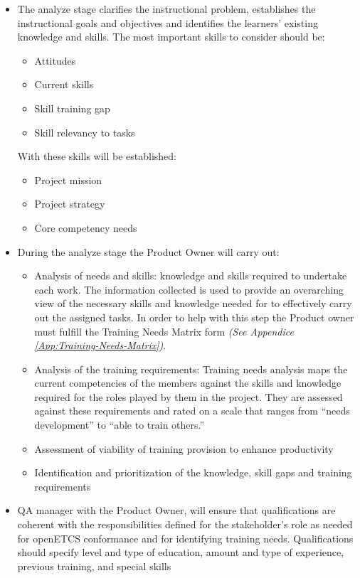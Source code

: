 \documentclass{template/openetcs_article}
\begin{document}
\begin{itemize}
\item The analyze stage clarifies the instructional problem, establishes the instructional goals and objectives and identifies the learners' existing knowledge and skills. The most important skills to consider should be: 
\begin{itemize}
\item Attitudes
\item Current skills
\item Skill training gap
\item Skill relevancy to tasks
\end{itemize}
With these skills will be established:
\begin{itemize}
\item Project mission
\item Project strategy
\item Core competency needs
\end{itemize}
\item During the analyze stage the Product Owner will carry out:
\begin{itemize}
\item Analysis of needs and skills: knowledge and skills required to undertake each work. The information collected is used to provide an overarching view of the necessary skills and knowledge needed for to effectively carry out the assigned tasks. In order to help with this step the Product owner must fulfill the Training Needs Matrix form {\it{(See Appendice \ref{App:Training-Needs-Matrix})}}.
\item Analysis of the training requirements: Training needs analysis maps the current competencies of the members against the skills and knowledge required for the roles played by them in the project. They are assessed against these requirements and rated on a scale that ranges from “needs development” to “able to train others.”
\item Assessment of viability of training provision to enhance productivity
\item Identification and prioritization of the knowledge, skill gaps and training requirements
\end{itemize}
\item QA manager with the Product Owner, will ensure that qualifications are coherent with the responsibilities defined for the stakeholder’s role as needed for openETCS conformance and for identifying training needs. Qualifications should specify level and type of education, amount and type of experience, previous training, and special skills
\end{itemize}
\end{document}
